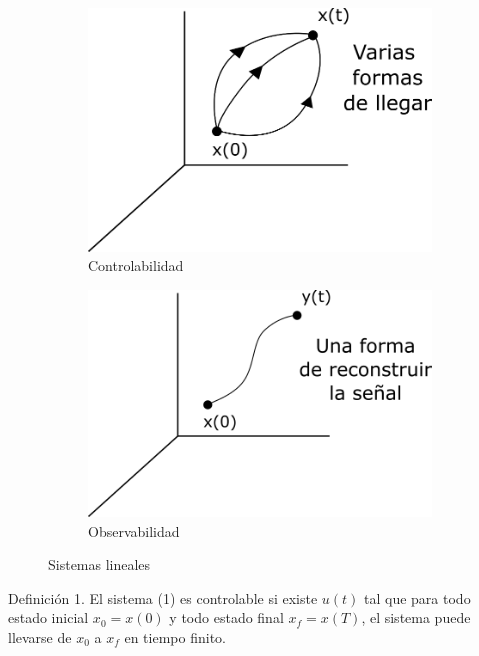 \begin{figure}[h!]
    \centering
    \begin{subfigure}[b]{0.45\linewidth}
        \includegraphics[scale=0.25]{Control de Sistemas Mecatronicos Figuras/01 Controlabilidad}
        \caption{Controlabilidad}
    \end{subfigure}
    \begin{subfigure}[b]{0.45\linewidth}
        \includegraphics[scale=0.25]{Control de Sistemas Mecatronicos Figuras/02 Observabilidad}
        \caption{Observabilidad}
    \end{subfigure}
    \caption{Sistemas lineales}
\end{figure}

Definición 1. El sistema (1) es controlable si existe \(u(t)\) tal que para todo estado inicial \( x_{0}=x(0) \) y todo estado final \(x_{f}=x(T)\), el sistema puede llevarse de \( x_{0} \) a \( x_{f} \) en tiempo finito.